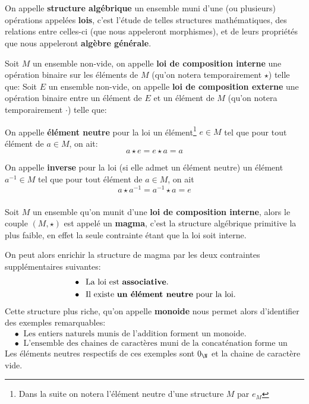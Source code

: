 \chapter*{}

On appelle \textbf{structure algébrique} un ensemble muni d'une (ou plusieurs) opérations appelées \textbf{lois}, c'est l'étude de telles structures mathématiques, des relations entre celles-ci (que nous appeleront morphismes), et de leurs propriétés que nous appeleront \textbf{algèbre générale}.\<

Soit \(M\) un ensemble non-vide, on appelle \textbf{loi de composition interne} une opération binaire sur les éléments de \(M\) (qu'on notera temporairement \(\star\)) telle que:
Soit \(E\) un ensemble non-vide, on appelle \textbf{loi de composition externe} une opération binaire entre un élément de \(E\) et un élément de \(M\) (qu'on notera temporairement \(\cdot\)) telle que:

On appelle \textbf{élément neutre} pour la loi un élément\footnote[1]{Dans la suite on notera l'élément neutre d'une structure \(M\) par \(e_M\)} \(e \in M\) tel que pour tout élément de \(a \in M\), on ait:
\[a \star e = e \star a = a\]

On appelle \textbf{inverse} pour la loi (si elle admet un élément neutre) un élément \(a^{-1} \in M\) tel que pour tout élément de \(a \in M\), on ait 
\[a \star a^{-1} = a^{-1} \star a = e\]

\subsection*{}
Soit \(M\) un ensemble qu'on munit d'une \textbf{loi de composition interne}, alors le couple \((M, \star)\) est appelé un \textbf{magma}, c'est la structure algébrique primitive la plus faible, en effet la seule contrainte étant que la loi soit interne.\<

On peut alors enrichir la structure de magma par les deux contraintes supplémentaires suivantes:
\begin{align*}
   &\bullet \;\; \text{La loi est \textbf{associative}.}\\
   &\bullet \;\; \text{Il existe \textbf{un élément neutre} pour la loi.}
\end{align*}
Cette structure plus riche, qu'on appelle \textbf{monoide} nous permet alors d'identifier des exemples remarquables:
\begin{align*}
   &\bullet \;\; \text{Les entiers naturels munis de l'addition forment un monoide.}\\
   &\bullet \;\; \text{L'ensemble des chaines de caractères muni de la concaténation forme un monoide.}
\end{align*}
Les éléments neutres respectifs de ces exemples sont \(0_\N\) et la chaine de caractère vide.

